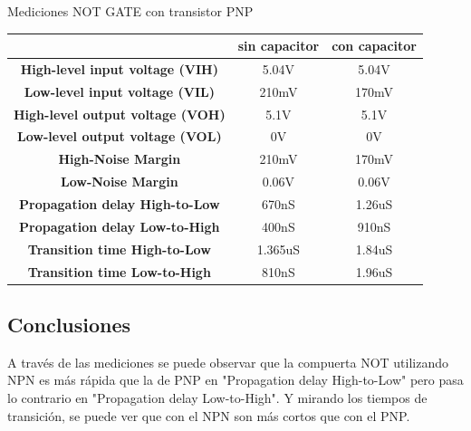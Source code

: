 \begin{center}
Mediciones NOT GATE con transistor PNP
	\begin{center}
		\begin{tabular}{|c|c|c|}
					\hline
					\textbf{} & \textbf{sin capacitor} & \textbf{con capacitor}\\
					\hline
					\textbf{High-level input voltage (VIH)} & 5.04V & 5.04V\\
					\hline
					\textbf{Low-level input voltage (VIL)} & 210mV & 170mV\\
					\hline
					\textbf{High-level output voltage (VOH)} & 5.1V & 5.1V\\
					\hline
					\textbf{Low-level output voltage (VOL)} & 0V & 0V\\
					\hline
					\textbf{High-Noise Margin} & 210mV & 170mV\\
					\hline
					\textbf{Low-Noise Margin} & 0.06V & 0.06V\\
					\hline
					\textbf{Propagation delay High-to-Low} & 670nS & 1.26uS\\
					\hline
					\textbf{Propagation delay Low-to-High} & 400nS & 910nS\\
					\hline
					\textbf{Transition time High-to-Low} & 1.365uS & 1.84uS\\
					\hline
					\textbf{Transition time Low-to-High}	& 810nS & 1.96uS\\
					\hline
				\end{tabular}
	\end{center}
\end{center}
\subsection{Conclusiones}
A través de las mediciones se puede observar que la compuerta NOT utilizando NPN es más rápida que la de PNP en "Propagation delay High-to-Low" pero pasa lo contrario en "Propagation delay Low-to-High". Y mirando los tiempos de transición, se puede ver que con el NPN son más cortos que con el PNP.
			
